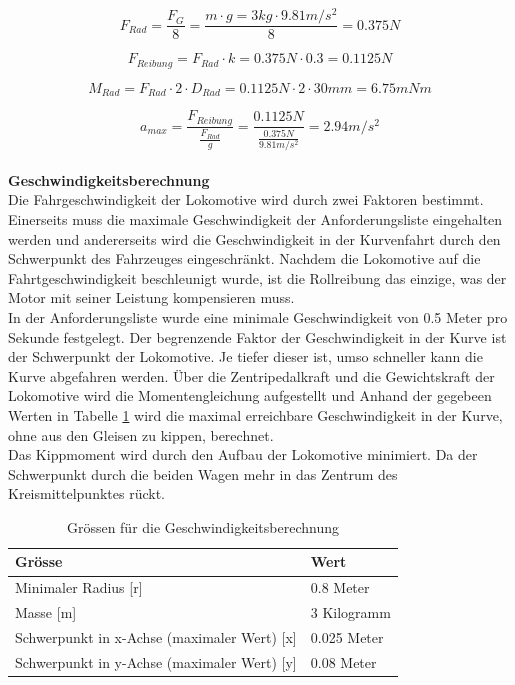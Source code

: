 \documentclass[../../main.tex]{subfiles}
\begin{document}
    $$F_{Rad}=\frac{F_{G}}{8}=\frac{m \cdot g=3kg \cdot 9.81m/s^2}{8}=0.375N$$

    $$F_{Reibung}=F_{Rad} \cdot k=0.375N \cdot 0.3=0.1125N$$

    $$M_{Rad}=F_{Rad} \cdot 2\cdot D_{Rad}= 0.1125N \cdot 2 \cdot 30mm = 6.75mNm$$

    $$a_{max}=\frac{F_{Reibung}}{\frac{F_{Rad}}{g}}=\frac{0.1125N}{\frac{0.375N}{9.81m/s^2}}=2.94m/s^2$$
    \\

    \label{GeschwindigkeitsberechnungFahrwerk}
    \textbf{Geschwindigkeitsberechnung}\\
    Die Fahrgeschwindigkeit der Lokomotive wird durch zwei Faktoren bestimmt. Einerseits muss die maximale Geschwindigkeit der Anforderungsliste eingehalten werden und andererseits wird die Geschwindigkeit in der Kurvenfahrt durch den Schwerpunkt des Fahrzeuges eingeschränkt. Nachdem die Lokomotive auf die Fahrtgeschwindigkeit beschleunigt wurde, ist die Rollreibung das einzige, was der Motor mit seiner Leistung kompensieren muss.\\

    In der Anforderungsliste wurde eine minimale Geschwindigkeit von 0.5 Meter pro Sekunde festgelegt. Der begrenzende Faktor der Geschwindigkeit in der Kurve ist der Schwerpunkt der Lokomotive. Je tiefer dieser ist, umso schneller kann die Kurve abgefahren werden. Über die Zentripedalkraft und die Gewichtskraft der Lokomotive wird die Momentengleichung aufgestellt und Anhand der gegebeen Werten in Tabelle \ref{tab:geschwindigkeitsberechnung} wird die maximal erreichbare Geschwindigkeit in der Kurve, ohne aus den Gleisen zu kippen, berechnet.\\

    Das Kippmoment wird durch den Aufbau der Lokomotive minimiert. Da der Schwerpunkt durch die beiden Wagen mehr in das Zentrum des Kreismittelpunktes rückt.\\

    \begin{table}[H] \centering
        \begin{tabular}{|l|l|}
        \hline
        \textbf{Grösse} & \textbf{Wert}\\
        \hline
        Minimaler Radius  [r]                               & 0.8 Meter\\
         \hline
        Masse [m]                                           & 3 Kilogramm\\
        \hline
        Schwerpunkt in x-Achse (maximaler Wert) [x]         & 0.025 Meter\\
        \hline
        Schwerpunkt in y-Achse (maximaler Wert) [y]         & 0.08 Meter\\
        \hline
        \end{tabular}

        \caption{Grössen für die Geschwindigkeitsberechnung}
        \label{tab:geschwindigkeitsberechnung}
        \end{table}
\end{document}

